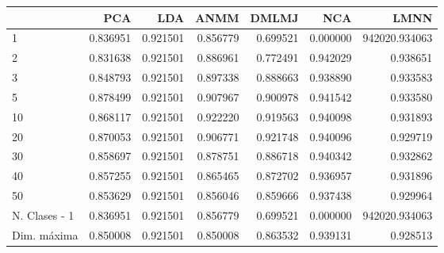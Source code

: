 \begin{tabular}{lrrrrrr}
\toprule
{} &       PCA &       LDA &      ANMM &     DMLMJ &       NCA &           LMNN \\
\midrule
1             &  0.836951 &  0.921501 &  0.856779 &  0.699521 &  0.000000 &  942020.934063 \\
2             &  0.831638 &  0.921501 &  0.886961 &  0.772491 &  0.942029 &       0.938651 \\
3             &  0.848793 &  0.921501 &  0.897338 &  0.888663 &  0.938890 &       0.933583 \\
5             &  0.878499 &  0.921501 &  0.907967 &  0.900978 &  0.941542 &       0.933580 \\
10            &  0.868117 &  0.921501 &  0.922220 &  0.919563 &  0.940098 &       0.931893 \\
20            &  0.870053 &  0.921501 &  0.906771 &  0.921748 &  0.940096 &       0.929719 \\
30            &  0.858697 &  0.921501 &  0.878751 &  0.886718 &  0.940342 &       0.932862 \\
40            &  0.857255 &  0.921501 &  0.865465 &  0.872702 &  0.936957 &       0.931896 \\
50            &  0.853629 &  0.921501 &  0.856046 &  0.859666 &  0.937438 &       0.929964 \\
N. Clases - 1 &  0.836951 &  0.921501 &  0.856779 &  0.699521 &  0.000000 &  942020.934063 \\
Dim. máxima   &  0.850008 &  0.921501 &  0.850008 &  0.863532 &  0.939131 &       0.928513 \\
\bottomrule
\end{tabular}

